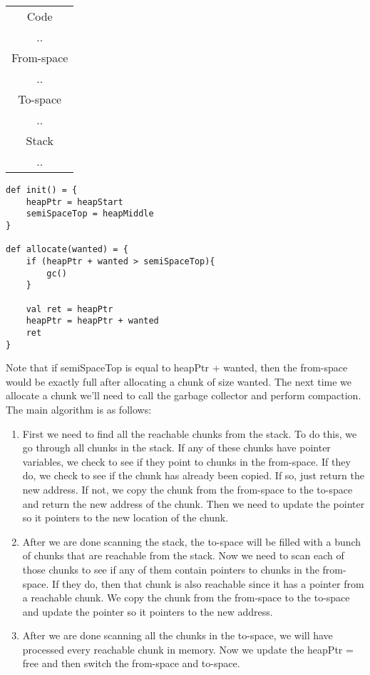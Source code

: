 \documentclass[12pt, letterpaper]{article}
\begin{document}
\begin{center}
\begin{tabular}{|c|}
\hline
Code\\
..\\
\hline
From-space\\
..\\
\hline
To-space\\
..\\
\hline
Stack\\
..\\
\hline
\end{tabular}
\end{center}

\begin{lstlisting}
def init() = {
	heapPtr = heapStart
	semiSpaceTop = heapMiddle
}

def allocate(wanted) = {
	if (heapPtr + wanted > semiSpaceTop){
		gc()
	}
	
	val ret = heapPtr
	heapPtr = heapPtr + wanted
	ret
}
\end{lstlisting}
Note that if semiSpaceTop is equal to heapPtr + wanted, then the from-space would be exactly full after allocating a chunk of size wanted. The next time we allocate a chunk we'll need to call the garbage collector and perform compaction.\\

The main algorithm is as follows:
\begin{enumerate}
\item First we need to find all the reachable chunks from the stack. To do this, we go through all chunks in the stack. If any of these chunks have pointer variables, we check to see if they point to chunks in the from-space. If they do, we check to see if the chunk has already been copied. If so, just return the new address. If not, we copy the chunk from the from-space to the to-space and return the new address of the chunk. Then we need to update the pointer so it pointers to the new location of the chunk.

\item After we are done scanning the stack, the to-space will be filled with a bunch of chunks that are reachable from the stack. Now we need to scan each of those chunks to see if any of them contain pointers to chunks in the from-space. If they do, then that chunk is also reachable since it has a pointer from a reachable chunk. We copy the chunk from the from-space to the to-space and update the pointer so it pointers to the new address.

\item After we are done scanning all the chunks in the to-space, we will have processed every reachable chunk in memory. Now we update the heapPtr = free and then switch the from-space and to-space.
\end{enumerate}
\end{document}
